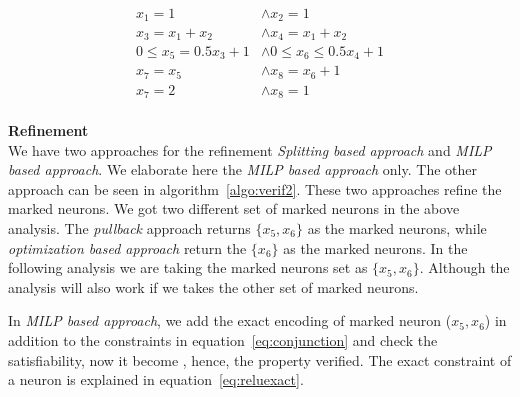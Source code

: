 \begin{equation}
    \begin{aligned}
        x_1 = 1 & \land x_2 = 1 \\
        x_3 = x_1 + x_2 & \land x_4 = x_1 + x_2 \\
        0 \leq x_5 = 0.5x_3 + 1 & \land 0\leq x_6 \leq 0.5x_4 + 1 \\ 
        x_7 = x_5 & \land x_8 = x_6 + 1 \\
        x_7 = 2 & \land x_8 = 1
    \end{aligned}
\label{eq:opt1}
\end{equation}
\\
\textbf{Refinement} \\
We have two approaches for the refinement {\em Splitting based approach} and {\em MILP based approach}.
We elaborate here the {\em MILP based approach} only. The other approach can be seen in algorithm~\ref{algo:verif2}. 
These two approaches refine the marked neurons. We got two different set of marked neurons in the above analysis. 
The {\em pullback} approach returns $\{x_5, x_6\}$ as the marked neurons, while {\em optimization based approach}
return the $\{x_6\}$ as the marked neurons. In the following analysis we are taking the marked neurons set as $\{x_5, x_6\}$.
Although the analysis will also work if we takes the other set of marked neurons.

In {\em MILP based approach}, we add the exact encoding of marked neuron ($x_5, x_6$) in addition to the constraints
in equation~\ref{eq:conjunction} and check the satisfiability, now it become \unsat{}, hence, the property verified. 
The exact constraint of a \relu{} neuron is explained in equation~\ref{eq:reluexact}. 


